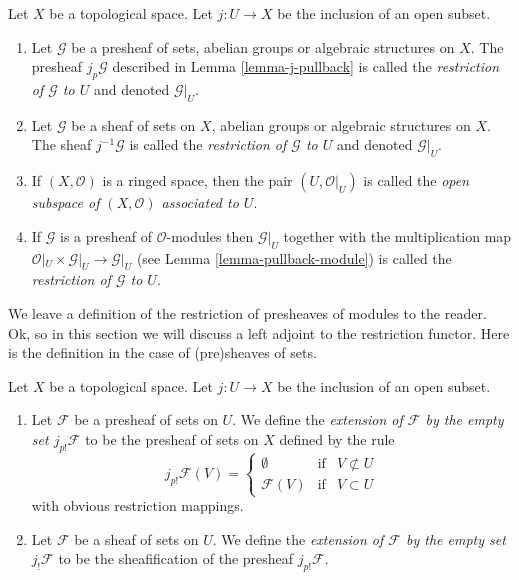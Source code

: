 \begin{definition}
\label{definition-restriction}
Let $X$ be a topological space.
Let $j : U \to X$ be the inclusion of an open subset.
\begin{enumerate}
\item Let $\mathcal{G}$ be a presheaf of sets, abelian groups or
algebraic structures on $X$. The presheaf $j_p\mathcal{G}$ described
in Lemma \ref{lemma-j-pullback} is called
the {\it restriction of $\mathcal{G}$ to $U$} and denoted $\mathcal{G}|_U$.
\item Let $\mathcal{G}$ be a sheaf of sets on $X$, abelian groups or
algebraic structures on $X$. The sheaf $j^{-1}\mathcal{G}$ is called
the {\it restriction of $\mathcal{G}$ to $U$} and denoted $\mathcal{G}|_U$.
\item If $(X, \mathcal{O})$ is a ringed space, then the pair
$(U, \mathcal{O}|_U)$ is called the
{\it open subspace of $(X, \mathcal{O})$ associated to $U$}.
\item If $\mathcal{G}$ is a presheaf of $\mathcal{O}$-modules
then $\mathcal{G}|_U$ together with the multiplication map
$\mathcal{O}|_U \times \mathcal{G}|_U \to \mathcal{G}|_U$
(see Lemma \ref{lemma-pullback-module})
is called the {\it restriction of $\mathcal{G}$ to $U$}.
\end{enumerate}
\end{definition}

\noindent
We leave a definition of the restriction of presheaves
of modules to the reader. Ok, so in this section we will
discuss a left adjoint to the restriction functor.
Here is the definition in the case of (pre)sheaves
of sets.

\begin{definition}
\label{definition-j-shriek}
Let $X$ be a topological space.
Let $j : U \to X$ be the inclusion of an open subset.
\begin{enumerate}
\item Let $\mathcal{F}$ be a presheaf of sets on $U$. We define
the {\it extension of $\mathcal{F}$ by the empty set $j_{p!}\mathcal{F}$}
to be the presheaf of sets on $X$ defined by the rule
$$
j_{p!}\mathcal{F}(V) =
\left\{
\begin{matrix}
\emptyset & \text{if} & V \not \subset U \\
\mathcal{F}(V) & \text{if} & V \subset U
\end{matrix}
\right.
$$
with obvious restriction mappings.
\item Let $\mathcal{F}$ be a sheaf of sets on $U$. We define
the {\it extension of $\mathcal{F}$ by the empty set $j_!\mathcal{F}$}
to be the sheafification of the presheaf $j_{p!}\mathcal{F}$.
\end{enumerate}
\end{definition}

